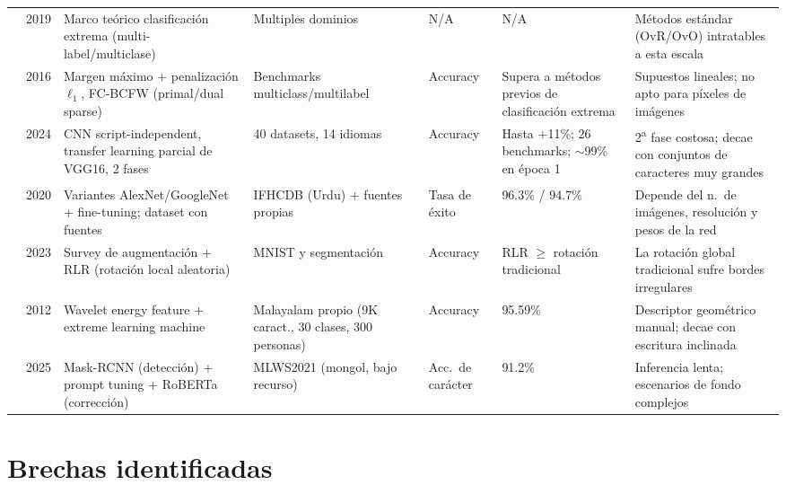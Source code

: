 \documentclass[conference]{IEEEtran}
\begin{document}
\begin{table}[p]
\begin{tabular}{p{2.0cm}p{1.6cm}p{3.1cm}p{2.7cm}p{1.6cm}p{2.5cm}p{3.0cm}}
\cite{bengio_extreme_2019} & 2019 &
Marco teórico clasificación extrema (multi-label/multiclase) &
Multiples dominios &
N/A &
N/A &
Métodos estándar (OvR/OvO) intratables a esta escala \\
\addlinespace

\cite{pdsparse_2016} & 2016 &
Margen máximo + penalización $\ell_1$, FC-BCFW (primal/dual sparse) &
Benchmarks multiclass/multilabel &
Accuracy &
Supera a métodos previos de clasificación extrema &
Supuestos lineales; no apto para píxeles de imágenes \\
\addlinespace

\cite{hcrnet_2024} & 2024 &
CNN script-independent, transfer learning parcial de VGG16, 2 fases &
40 datasets, 14 idiomas &
Accuracy &
Hasta +11\%; 26 benchmarks; $\sim$99\% en época 1 &
2\textsuperscript{a} fase costosa; decae con conjuntos de caracteres muy grandes \\
\addlinespace

\cite{ocrnets_2020} & 2020 &
Variantes AlexNet/GoogleNet + fine-tuning; dataset con fuentes &
IFHCDB (Urdu) + fuentes propias &
Tasa de éxito &
96.3\% / 94.7\% &
Depende del n.\ de imágenes, resolución y pesos de la red \\
\addlinespace

\cite{alomar_da_2023} & 2023 &
Survey de augmentación + RLR (rotación local aleatoria) &
MNIST y segmentación &
Accuracy &
RLR $\geq$ rotación tradicional &
La rotación global tradicional sufre bordes irregulares \\
\addlinespace

\cite{chacko_wavelet_2012} & 2012 &
Wavelet energy feature + extreme learning machine &
Malayalam propio (9K caract., 30 clases, 300 personas) &
Accuracy &
95.59\% &
Descriptor geométrico manual; decae con escritura inclinada \\
\addlinespace

\cite{pr2_2025} & 2025 &
Mask-RCNN (detección) + prompt tuning + RoBERTa (corrección) &
MLWS2021 (mongol, bajo recurso) &
Acc.\ de carácter &
91.2\% &
Inferencia lenta; escenarios de fondo complejos \\
\bottomrule
\end{tabular}
\end{table}



\section{Brechas identificadas}
\label{sec:gaps}
\end{document}
